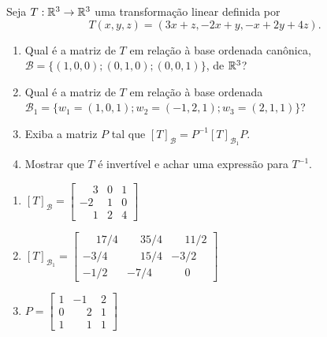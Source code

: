 \documentclass[12pt]{exam}
\begin{document}
\begin{exercicio}
    Seja $T : \mathbb{R}^3 \to \mathbb{R}^3$ uma transformação linear definida por
    \[
    T(x,y,z) = (3x + z,-2x + y,-x+2y + 4z).
    \]
    \begin{enumerate}[label={\alph*})]
        \item Qual é a matriz de $T$ em relação à base ordenada canônica, $\mathcal{B} = \{(1,0,0); (0,1,0); (0,0,1)\}$, de $\mathbb{R}^3$?

        \item Qual é a matriz de $T$ em relação à base ordenada $\mathcal{B}_1 = \{w_1 = (1,0,1); w_2 = (-1,2,1); w_3 = (2,1,1)\}$?

        \item Exiba a matriz $P$ tal que $[T]_{\mathcal{B}} = P^{-1}[T]_{\mathcal{B}_1}P$.

        \item Mostrar que $T$ é invertível e achar uma expressão para $T^{-1}$.
    \end{enumerate}
    \begin{solucao}
        \begin{enumerate}[label={\alph*})]
            \item $[T]_\mathcal{B} = \begin{bmatrix}
                \phantom{-}3 & 0 & 1\\
                -2 & 1 & 0\\
                \phantom{-}1 & 2 & 4
            \end{bmatrix}$

            \item $[T]_{\mathcal{B}_1} = \begin{bmatrix}
                \phantom{-}17/4 & \phantom{-}35/4 & \phantom{-}11/2\\
                -3/4 & \phantom{-}15/4 & -3/2\\
                -1/2 & -7/4 & \phantom{-}0
            \end{bmatrix}$

            \item $P = \begin{bmatrix}
                1 & -1 & 2\\
                0 & \phantom{-}2 & 1\\
                1 & \phantom{-}1 & 1
            \end{bmatrix}$
        \end{enumerate}
    \end{solucao}
\end{exercicio}
\end{document}
